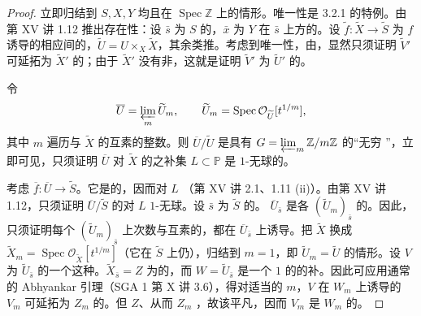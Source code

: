 \begin{proof}
立即归结到 $S,X,Y$ 均且在 $\operatorname{Spec}\mathbb Z$ 上的情形。唯一性是 3.2.1 的特例。由第 XV 讲 1.12 推出存在性：设 $\bar s$ 为 $S$ 的，$\bar x$ 为 $Y$ 在 $\bar s$ 上方的。设 $\widetilde f:\widetilde X\to\widetilde S$ 为 $f$ 诱导的相应间的，$\widetilde U=U\times_X\widetilde X$，其余类推。考虑到唯一性，由，显然只须证明 $\widetilde V'$ 可延拓为 $\widetilde X'$ 的；由于 $\widetilde X'$ 没有非，这就是证明 $\widetilde V'$ 为 $\widetilde U'$ 的。

令
\[
\overline U=\varprojlim_m\widetilde U_m,\qquad \widetilde U_m=\operatorname{Spec}\mathcal O_{\widetilde U}[t^{1/m}],
\]
其中 $m$ 遍历与 $\widetilde X$ 的互素的整数。则 $\overline U/\widetilde U$ 是具有 $G=\varprojlim_m\mathbb Z/m\mathbb Z$ 的“无穷 ”，立即可见，只须证明 $\overline U$ 对 $\widetilde X$ 的之补集 $L\subset\mathbb P$ 是 $1$-无球的。

考虑 $\overline f:\overline U\to\widetilde S$。它是的，因而对 $L$ （第 XV 讲 2.1、1.11 (ii)）。由第 XV 讲 1.12，只须证明 $\overline U/\widetilde S$ 的对 $L$ $1$-无球。设 $\bar s$ 为 $\widetilde S$ 的。 $\overline U_{\bar s}$ 是各 $(\widetilde U_m)_{\bar s}$ 的。因此，只须证明每个 $(\widetilde U_m)_{\bar s}$ 上次数与互素的，都在 $\overline U_{\bar s}$ 上诱导。把 $\widetilde X$ 换成 $\widetilde X_m=\operatorname{Spec}\mathcal O_{\widetilde X}[t^{1/m}]$（它在 $\widetilde S$ 上仍），归结到 $m=1$，即 $\widetilde U_m=\widetilde U$ 的情形。设 $V$ 为 $\widetilde U_{\bar s}$ 的一个这种。$\widetilde X_{\bar s}=Z$ 为的，而 $W=\widetilde U_{\bar s}$ 是一个 $1$ 的的补。因此可应用通常的 Abhyankar 引理（SGA 1 第 X 讲 3.6），得对适当的 $m$，$V$ 在 $W_m$ 上诱导的 $V_m$ 可延拓为 $Z_m$ 的。但 $Z$、从而 $Z_m$ ，故该平凡，因而 $V_m$ 是 $W_m$ 的。
\end{proof}
